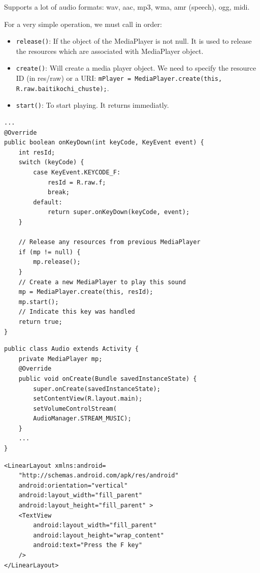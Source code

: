 Supports a lot of audio formats: wav, aac, mp3, wma, amr (speech), ogg, midi.

For a very simple operation, we must call in order: 
\begin{itemize}
    \item \texttt{release()}: If the object of the MediaPlayer is not null. 
    It is used to release the resources which are associated with MediaPlayer object.
    \item \texttt{create()}: Will create a media player object. We need to specify 
    the resource ID (in res/raw) or a URI: \texttt{mPlayer = MediaPlayer.create(this, R.raw.baitikochi\_chuste);}.
    \item \texttt{start()}: To start playing. It returns immediatly. 
\end{itemize}

\begin{lstlisting}[title=Creates media player on action]
...
@Override
public boolean onKeyDown(int keyCode, KeyEvent event) {
    int resId;
    switch (keyCode) {
        case KeyEvent.KEYCODE_F:
            resId = R.raw.f;
            break;
        default:
            return super.onKeyDown(keyCode, event);
    }

    // Release any resources from previous MediaPlayer
    if (mp != null) {
        mp.release();
    }
    // Create a new MediaPlayer to play this sound
    mp = MediaPlayer.create(this, resId);
    mp.start();
    // Indicate this key was handled
    return true;
}
\end{lstlisting}

\begin{lstlisting}
public class Audio extends Activity {
    private MediaPlayer mp;
    @Override
    public void onCreate(Bundle savedInstanceState) {
        super.onCreate(savedInstanceState);
        setContentView(R.layout.main);
        setVolumeControlStream(
        AudioManager.STREAM_MUSIC);
    }
    ...
}
\end{lstlisting}

\begin{lstlisting}[title=xml]
<LinearLayout xmlns:android=
    "http://schemas.android.com/apk/res/android"
    android:orientation="vertical"
    android:layout_width="fill_parent"
    android:layout_height="fill_parent" >
    <TextView
        android:layout_width="fill_parent"
        android:layout_height="wrap_content"
        android:text="Press the F key"
    />
</LinearLayout>
\end{lstlisting}

